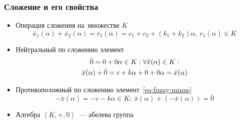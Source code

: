 \documentclass[12pt]{beamer}
\begin{document}
\begin{frame}
  \frametitle{Сложение и его свойства}
  \begin{itemize}
    \item Операция сложения на~множестве $K$
      \begin{equation}
        \label{eq:fuzzy-addition}
        \bar{x}_1\left(\alpha \right)+\bar{x}_2\left(\alpha \right)=r_1\left( \alpha  \right)=c_1+c_2+\left(k_1+k_2 \right)\alpha,\ r_1 \left( \alpha  \right)\in K
      \end{equation}
    \item Нейтральный по сложению элемент
      \begin{gather}
        \label{eq:fuzzy-zero}
        \bar{0}=0+0\alpha \in K: \forall \bar{x}(\alpha )\in K: \notag \\ 
        \bar{x}(\alpha )+\bar{0}=c+k\alpha +0+0\alpha =\bar{x}(\alpha )
      \end{gather}
    \item Противоположный по сложению элемент~\eqref{eq:fuzzy-minus} 
      \begin{equation}
        \label{eq:fuzzy-minus}
        -\bar{x}\left(\alpha \right)=-c-k\alpha \in K:\ \bar{x}\left( \alpha  \right)+\left( -\bar{x}\left( \alpha  \right) \right)=\bar{0}
      \end{equation}
    \item Алгебра $\left \langle K,+,0 \right \rangle$~--- абелева группа
  \end{itemize}
\end{frame}

\end{document}
